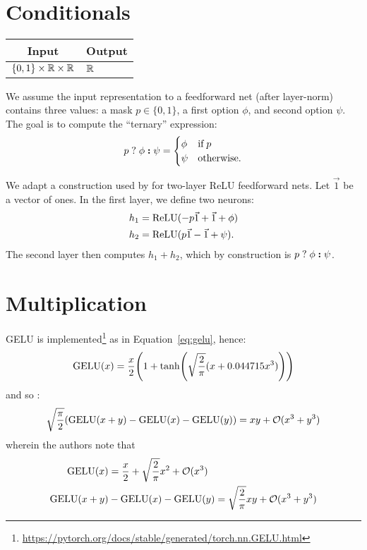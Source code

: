 \section{Conditionals}\label{sec:ffnn_conditional}

    \begin{tabular}{|c|p{1.5cm}|}
        \hline
        \rowcolor{orange!20} %
        \textbf{Input} & \textbf{Output} \\
        \hline
        $\{0,1\}\times \mathbb{R} \times \mathbb{R}$ & $\mathbb{R}$ \\
        \hline
    \end{tabular}

    We assume the input representation to a feedforward net (after layer-norm) contains three values: a mask $p \in \{0, 1\}$, a first option $\phi$, and second option $\psi$. The goal is to compute the ``ternary'' expression:
    \begin{equation*}
        p\;\mathbf{?}\; \phi\; \textbf{:} \;\psi =
        \begin{cases}
            \phi & \textrm{if} \; p \\
            \psi & \textrm{otherwise.}
        \end{cases}
    \end{equation*}

    We adapt a construction used by \citet[Theorem 1]{merrill-sabharwal-2024-cot} for two-layer ReLU feedforward nets.
    Let $\vec 1$ be a vector of ones.
    In the first layer, we define two neurons:
    \begin{align*}
        h_1 &= \text{ReLU}(-p \vec 1 + \vec 1 + \phi) \\
        h_2 &= \text{ReLU}(p \vec 1 - \vec 1 + \psi) .
    \end{align*}
    The second layer then computes $h_1 + h_2$, which by construction is $p\;\mathbf{?}\; \phi\; \textbf{:} \;\psi$.

\section{Multiplication}
\label{sec:ffnn_multiplication}

GELU is implemented\footnote{\url{https://pytorch.org/docs/stable/generated/torch.nn.GELU.html}} as in Equation~\eqref{eq:gelu}, hence:
\begin{align*}
    \GELU(x) = \frac{x}{2} \parens*{1 + \tanh\parens*{\sqrt{\frac{2}{\pi}} (x + 0.044715x^3)}}
\end{align*}
and so \citep[Lemma 4]{akyurek2022learning}:
\begin{align*}
    \sqrt{\frac{\pi}{2}}
    (\text{GELU}(x + y) - \text{GELU}(x) - \text{GELU}(y))
    = xy + \mathcal{O}(x^3 + y^3)
\end{align*}
wherein the authors note that
\begin{align*}
    \text{GELU}(x) &= \frac{x}{2} + \sqrt{\frac{2}{\pi}}x^2 + \mathcal{O}(x^3) \\
    \text{GELU}(x + y) &- \text{GELU}(x) - \text{GELU}(y) = \sqrt{\frac{2}{\pi}} xy + \mathcal{O}(x^3 + y^3)
\end{align*}



